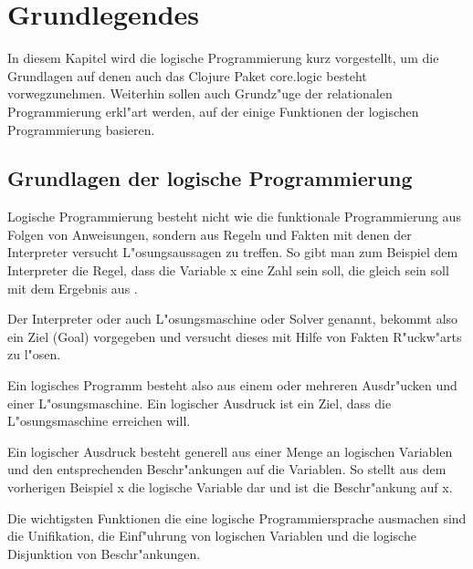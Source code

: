 \section{Grundlegendes}

In diesem Kapitel wird die logische Programmierung kurz vorgestellt, um die Grundlagen auf denen auch das Clojure Paket core.logic besteht vorwegzunehmen. Weiterhin sollen auch Grundz"uge der relationalen Programmierung erkl"art werden, auf der einige Funktionen der logischen Programmierung basieren.

\subsection{Grundlagen der logische Programmierung}

Logische Programmierung besteht nicht wie die funktionale Programmierung aus Folgen von Anweisungen, sondern aus Regeln und Fakten mit denen der Interpreter versucht L"osungsaussagen zu treffen. So gibt man zum Beispiel dem Interpreter die Regel, dass die Variable x eine Zahl sein soll, die gleich sein soll mit dem Ergebnis aus .

Der Interpreter oder auch L"osungsmaschine oder Solver genannt, bekommt also ein Ziel (Goal) vorgegeben und versucht dieses mit Hilfe von Fakten R"uckw"arts zu l"osen.


Ein logisches Programm besteht also aus einem oder mehreren Ausdr"ucken und einer L"osungsmaschine. Ein logischer Ausdruck ist ein Ziel, dass die L"osungsmaschine erreichen will.

Ein logischer Ausdruck besteht generell aus einer Menge an logischen Variablen und den entsprechenden Beschr"ankungen auf die Variablen. So stellt aus dem vorherigen Beispiel x die logische Variable dar und  ist die Beschr"ankung auf x.


Die wichtigsten Funktionen die eine logische Programmiersprache ausmachen sind die Unifikation, die Einf"uhrung von logischen Variablen und die logische Disjunktion von Beschr"ankungen.
